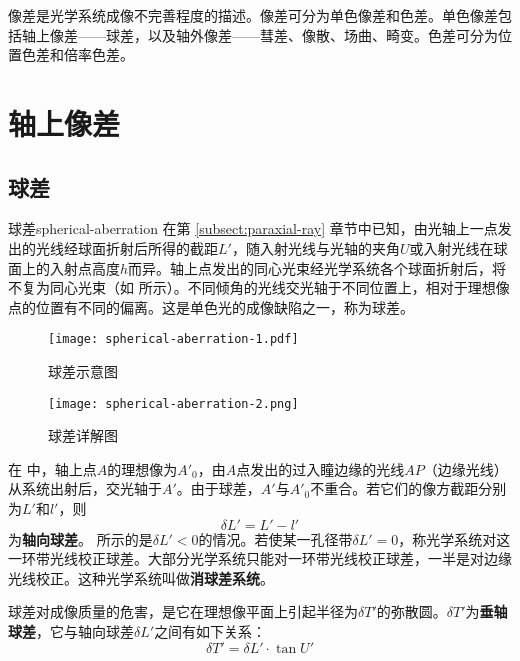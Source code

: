 \documentclass[cn,10pt,chinesefont=founder,math=mtpro2,cite=super,toc=onecol,twoside,openany]{elegantbook}
\begin{document}
像差是光学系统成像不完善程度的描述。像差可分为单色像差和色差。单色像差包括轴上像差——球差，以及轴外像差——彗差、像散、场曲、畸变。色差可分为位置色差和倍率色差。
\section{轴上像差}
\subsection{球差}
\label{subsect:spherical-aberration}
\begin{definition}{球差}{spherical-aberration}
在第 \ref{subsect:paraxial-ray} 章节中已知，由光轴上一点发出的光线经球面折射后所得的截距$L'$，随入射光线与光轴的夹角$U$或入射光线在球面上的入射点高度$h$而异。轴上点发出的同心光束经光学系统各个球面折射后，将不复为同心光束（如 所示）。不同倾角的光线交光轴于不同位置上，相对于理想像点的位置有不同的偏离。这是单色光的成像缺陷之一，称为球差。
\end{definition}

\begin{figure}[htbp]
	\centering
	\begin{minipage}[t]{0.3\textwidth}
		\centering
		\texttt{[image: spherical-aberration-1.pdf]}
		\caption{球差示意图}
		\label{fig:spherical-aberration-1}
	\end{minipage}
	\quad
	\begin{minipage}[t]{0.65\textwidth}
		\centering
		\texttt{[image: spherical-aberration-2.png]}
		\caption{球差详解图}
		\label{fig:spherical-aberration-2}
	\end{minipage}
\end{figure}

在 中，轴上点$A$的理想像为$A'_0$，由$A$点发出的过入瞳边缘的光线$AP$（边缘光线）从系统出射后，交光轴于$A'$。由于球差，$A'$与$A'_0$不重合。若它们的像方截距分别为$L'$和$l'$，则
\begin{equation}
\delta L'=L'-l'
\label{eq:spherical-aberration}
\end{equation}
为\textbf{轴向球差}。 所示的是$\delta L'<0$的情况。若使某一孔径带$\delta L'=0$，称光学系统对这一环带光线校正球差。大部分光学系统只能对一环带光线校正球差，一半是对边缘光线校正。这种光学系统叫做\textbf{消球差系统}。

球差对成像质量的危害，是它在理想像平面上引起半径为$\delta T'$的弥散圆。$\delta T'$为\textbf{垂轴球差}，它与轴向球差$\delta L'$之间有如下关系：
\begin{equation}
\delta T'=\delta L'\cdot\tan U'
\label{eq:spherical-aberration-relationship}
\end{equation}
\end{document}
